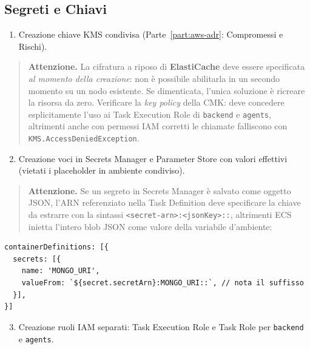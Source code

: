 \documentclass[11pt,a4paper]{article}
\begin{document}
\subsection{Segreti e Chiavi}

\begin{enumerate}
    \item Creazione chiave KMS condivisa (Parte~\ref{part:aws-adr}: Compromessi e Rischi).
\end{enumerate}

\begin{quote}
\textbf{Attenzione.} La cifratura a riposo di \textbf{ElastiCache} deve essere specificata \emph{al momento della creazione}: non è possibile abilitarla in un secondo momento su un nodo esistente. Se dimenticata, l'unica soluzione è ricreare la risorsa da zero. Verificare la \emph{key policy} della CMK: deve concedere esplicitamente l'uso ai Task Execution Role di \texttt{backend} e \texttt{agents}, altrimenti anche con permessi IAM corretti le chiamate falliscono con \texttt{KMS.AccessDeniedException}.
\end{quote}

\begin{enumerate}
    \setcounter{enumi}{1}
    \item Creazione voci in Secrets Manager e Parameter Store con valori effettivi (vietati i placeholder in ambiente condiviso).
\end{enumerate}

\begin{quote}
\textbf{Attenzione.} Se un segreto in Secrets Manager è salvato come oggetto JSON, l'ARN referenziato nella Task Definition deve specificare la chiave da estrarre con la sintassi \texttt{<secret-arn>:<jsonKey>::}, altrimenti ECS inietta l'intero blob JSON come valore della variabile d'ambiente:
\end{quote}

\begin{lstlisting}[caption={Estrazione di una singola chiave da un secret JSON}]
containerDefinitions: [{
  secrets: [{
    name: 'MONGO_URI',
    valueFrom: `${secret.secretArn}:MONGO_URI::`, // nota il suffisso
  }],
}]
\end{lstlisting}

\begin{enumerate}
    \setcounter{enumi}{2}
    \item Creazione ruoli IAM separati: Task Execution Role e Task Role per \texttt{backend} e \texttt{agents}.
\end{enumerate}
\end{document}
